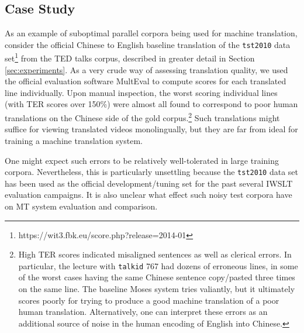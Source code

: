 \subsection{Case Study}
\label{subsec:case_study}


As an example of suboptimal parallel corpora being used for machine translation, consider the official Chinese to English baseline translation of the {\small \tt tst2010} data set\footnote{https://wit3.fbk.eu/score.php?release=2014-01} from the TED talks corpus, described in greater detail in Section \ref{sec:experiments}.
As a very crude way of assessing translation quality, we used the official evaluation software MultEval  to compute scores for each translated line individually.
Upon manual inspection, the worst scoring individual lines (with TER scores over 150\%) were almost all found to correspond to poor human translations on the Chinese side of the gold corpus.\footnote{
    High TER scores indicated misaligned sentences as well as clerical errors.  In particular, the lecture with {\small \tt talkid} 767 had dozens of erroneous lines, in some of the worst cases having the same Chinese sentence copy/pasted three times on the same line. 
    The baseline Moses system tries valiantly, but it ultimately scores poorly for trying to produce a good machine translation of a poor human translation.
    Alternatively, one can interpret these errors as an additional source of noise in the human encoding of English into Chinese.
}
Such translations might suffice for viewing translated videos monolingually, but they are far from ideal for training a machine translation system.

One might expect such errors to be relatively well-tolerated in large training corpora. 
Nevertheless, this is particularly unsettling because the {\small \tt tst2010} data set has been used as the official development/tuning set for the past several IWSLT evaluation campaigns. 
It is also unclear what effect such noisy test corpora have on MT system evaluation and comparison.

